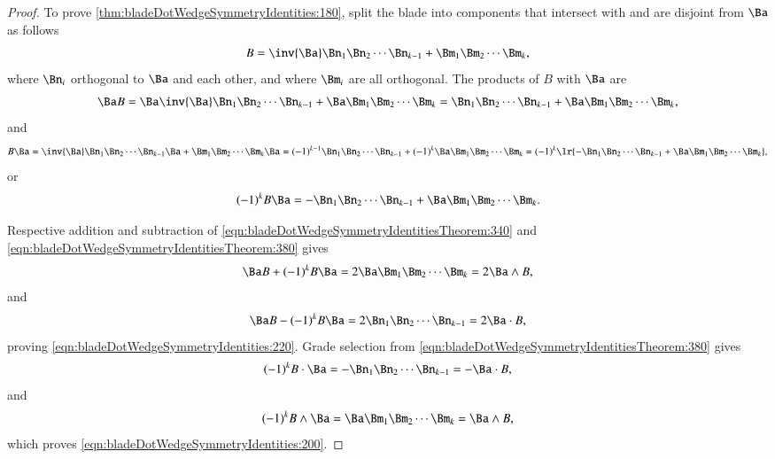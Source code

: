 \begin{proof}
To prove \cref{thm:bladeDotWedgeSymmetryIdentities:180}, split the blade into components that intersect with and are disjoint from \( \Ba \) as follows
\begin{dmath}\label{eqn:bladeDotWedgeSymmetryIdentitiesTheorem:240}
B
=
\inv{\Ba} \Bn_1 \Bn_2 \cdots \Bn_{k-1} + \Bm_1 \Bm_2 \cdots \Bm_k,
\end{dmath}
where \( \Bn_i \) orthogonal to \( \Ba \) and each other, and where \( \Bm_i \) are all orthogonal.  The products of \( B \) with \( \Ba \) are
\begin{dmath}\label{eqn:bladeDotWedgeSymmetryIdentitiesTheorem:340}
\Ba B
=
\Ba \inv{\Ba} \Bn_1 \Bn_2 \cdots \Bn_{k-1} + \Ba \Bm_1 \Bm_2 \cdots \Bm_k
=
\Bn_1 \Bn_2 \cdots \Bn_{k-1} + \Ba \Bm_1 \Bm_2 \cdots \Bm_k,
\end{dmath}
and
\begin{dmath}\label{eqn:bladeDotWedgeSymmetryIdentitiesTheorem:360}
B \Ba
=
\inv{\Ba} \Bn_1 \Bn_2 \cdots \Bn_{k-1} \Ba + \Bm_1 \Bm_2 \cdots \Bm_k \Ba
=
(-1)^{k-1} \Bn_1 \Bn_2 \cdots \Bn_{k-1} + (-1)^k \Ba \Bm_1 \Bm_2 \cdots \Bm_k
=
(-1)^k \lr{ - \Bn_1 \Bn_2 \cdots \Bn_{k-1} + \Ba \Bm_1 \Bm_2 \cdots \Bm_k },
\end{dmath}
or
\begin{dmath}\label{eqn:bladeDotWedgeSymmetryIdentitiesTheorem:380}
(-1)^k B \Ba
=
- \Bn_1 \Bn_2 \cdots \Bn_{k-1} + \Ba \Bm_1 \Bm_2 \cdots \Bm_k.
\end{dmath}

Respective addition and subtraction of \cref{eqn:bladeDotWedgeSymmetryIdentitiesTheorem:340} and \cref{eqn:bladeDotWedgeSymmetryIdentitiesTheorem:380} gives
\begin{dmath}\label{eqn:bladeDotWedgeSymmetryIdentitiesTheorem:400}
\Ba B + (-1)^k B \Ba
= 2 \Ba \Bm_1 \Bm_2 \cdots \Bm_k
= 2 \Ba \wedge B,
\end{dmath}
and
\begin{dmath}\label{eqn:bladeDotWedgeSymmetryIdentitiesTheorem:420}
\Ba B - (-1)^k B \Ba
=
2
\Bn_1 \Bn_2 \cdots \Bn_{k-1}
= 2 \Ba \cdot B,
\end{dmath}
proving \cref{eqn:bladeDotWedgeSymmetryIdentities:220}.  Grade selection from \cref{eqn:bladeDotWedgeSymmetryIdentitiesTheorem:380} gives
\begin{dmath}\label{eqn:bladeDotWedgeSymmetryIdentitiesTheorem:440}
(-1)^k B \cdot \Ba
=
- \Bn_1 \Bn_2 \cdots \Bn_{k-1}
= - \Ba \cdot B,
\end{dmath}
and
\begin{dmath}\label{eqn:bladeDotWedgeSymmetryIdentitiesTheorem:460}
(-1)^k B \wedge \Ba
=
\Ba \Bm_1 \Bm_2 \cdots \Bm_k
= \Ba \wedge B,
\end{dmath}
which proves \cref{eqn:bladeDotWedgeSymmetryIdentities:200}.
\end{proof}

